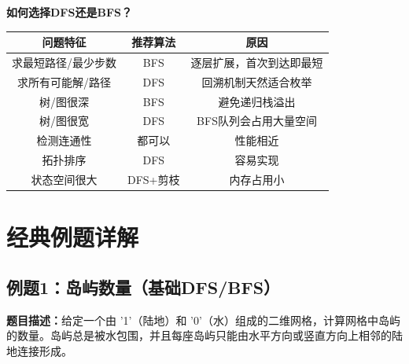 \documentclass[12pt,a4paper]{article}
\begin{document}
	\begin{orangebox}
		\textbf{如何选择DFS还是BFS？}
		
		\begin{center}
			\begin{tabular}{|c|c|c|}
				\hline
				\textbf{问题特征} & \textbf{推荐算法} & \textbf{原因} \\
				\hline
				求最短路径/最少步数 & BFS & 逐层扩展，首次到达即最短 \\
				\hline
				求所有可能解/路径 & DFS & 回溯机制天然适合枚举 \\
				\hline
				树/图很深 & BFS & 避免递归栈溢出 \\
				\hline
				树/图很宽 & DFS & BFS队列会占用大量空间 \\
				\hline
				检测连通性 & 都可以 & 性能相近 \\
				\hline
				拓扑排序 & DFS & 容易实现 \\
				\hline
				状态空间很大 & DFS+剪枝 & 内存占用小 \\
				\hline
			\end{tabular}
		\end{center}
	\end{orangebox}
	
	\section{经典例题详解}
	
	\subsection{例题1：岛屿数量（基础DFS/BFS）}
	
	\textbf{题目描述：}给定一个由 '1'（陆地）和 '0'（水）组成的二维网格，计算网格中岛屿的数量。岛屿总是被水包围，并且每座岛屿只能由水平方向或竖直方向上相邻的陆地连接形成。
	
\end{document}
